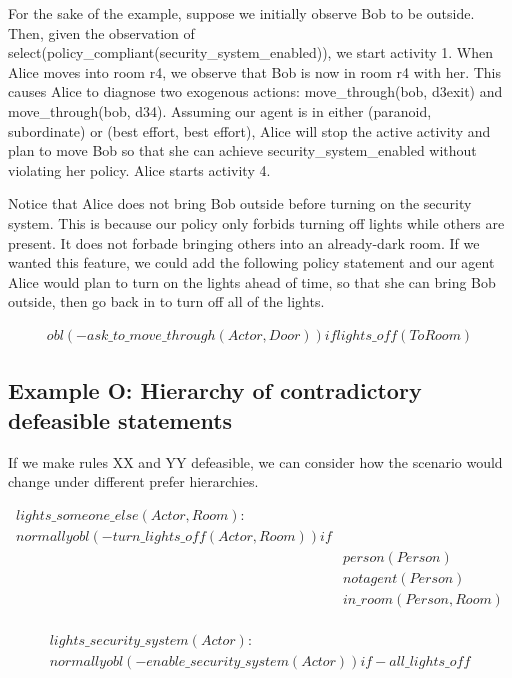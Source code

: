 For the sake of the example, suppose we initially observe Bob to be outside.
Then, given the observation of select(policy\_compliant(security\_system\_enabled)), we start activity 1.
When Alice moves into room r4, we observe that Bob is now in room r4 with her.
This causes Alice to diagnose two exogenous actions: move\_through(bob, d3exit) and move\_through(bob, d34).
Assuming our agent is in either (paranoid, subordinate) or (best effort, best effort), Alice will stop the active activity and plan to move Bob so that she can achieve security\_system\_enabled without violating her policy.
Alice starts activity 4.

Notice that Alice does not bring Bob outside before turning on the security system.
This is because our policy only forbids turning off lights while others are present.
It does not forbade bringing others into an already-dark room.
If we wanted this feature, we could add the following policy statement and our agent Alice would plan to turn on the lights ahead of time, so that she can bring Bob outside, then go back in to turn off all of the lights.

\begin{equation}
\begin{split}
obl(-ask\_to\_move\_through(Actor, Door)) if
    lights\_off(ToRoom)
\end{split}
\end{equation}

\subsection{Example O: Hierarchy of contradictory defeasible statements}

If we make rules XX and YY defeasible, we can consider how the scenario would change under different prefer hierarchies.

\begin{equation}
\begin{split}
lights\_someone\_else(Actor, Room): \\
normally obl(-turn\_lights\_off(Actor, Room)) if \\
    & person(Person) \\
    & not agent(Person) \\
    & in\_room(Person, Room) \\
\end{split}
\end{equation}

\begin{equation}
\begin{split}
lights\_security\_system(Actor): \\
normally obl(-enable\_security\_system(Actor)) if
    -all\_lights\_off
\end{split}
\end{equation}

